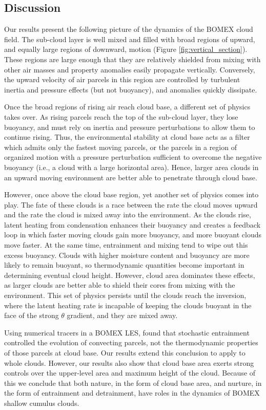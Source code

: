 \documentclass[acp]{copernicus}
\begin{document}
\subsection{Discussion}

Our results present the following picture of the dynamics of the BOMEX cloud 
field.  The sub-cloud layer is well mixed and filled with broad regions of 
upward, and equally large regions of downward, motion (Figure 
\ref{fig:vertical_section}).  These regions are large enough that they are 
relatively shielded from mixing with other air masses and property anomalies 
easily propagate vertically.  Conversely, the upward velocity of air parcels in 
this region are controlled by turbulent inertia and pressure effects (but not 
buoyancy), and anomalies quickly dissipate.

Once the broad regions of rising air reach cloud base, a different set of 
physics takes over.  As rising parcels reach the top of the sub-cloud layer, 
they lose buoyancy, and must rely on inertia and pressure perturbations to 
allow them to continue rising.  Thus, the environmental stability at cloud base 
acts as a filter which admits only the fastest moving parcels, or the parcels 
in a region of organized motion with a pressure perturbation sufficient to 
overcome the negative buoyancy (i.e., a cloud with a large horizontal area).  
Hence, larger area clouds in an upward moving environment are better able to
penetrate through cloud base.

However, once above the cloud base region, yet another set of physics comes 
into play.  The fate of these clouds is a race between the rate the cloud moves 
upward and the rate the cloud is mixed away into the environment.  As the 
clouds rise, latent heating from condensation enhances their buoyancy and 
creates a feedback loop in which faster moving clouds gain more buoyancy, and 
more buoyant clouds move faster.  At the same time, entrainment and mixing 
tend to wipe out this excess buoyancy.  Clouds with higher moisture content and 
buoyancy are more likely to remain buoyant, so thermodynamic quantities become 
important in determining eventual cloud height.  However, cloud area dominates 
these effects, as larger clouds are better able to shield their cores from 
mixing with the environment.  This set of physics persists until the clouds 
reach the inversion, where the latent heating rate is incapable of keeping the 
clouds buoyant in the face of the strong $\theta$ gradient, and they are mixed 
away.

Using numerical tracers in a BOMEX LES, \cite{Romps2010a} found that 
stochastic entrainment controlled the evolution of convecting parcels, not 
the thermodynamic properties of those parcels at cloud base.  Our results 
extend this conclusion to apply to whole clouds.  However, our results also 
show that cloud base area exerts strong controls over the upper-level area and 
maximum height of the cloud.  Because of this we conclude that both nature, in 
the form of cloud base area, and nurture, in the form of entrainment and 
detrainment, have roles in the dynamics of BOMEX shallow cumulus clouds.  
\end{document}
